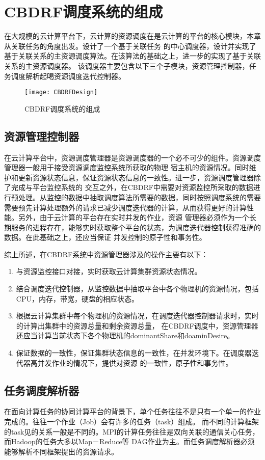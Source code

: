 \section{CBDRF调度系统的组成}
在大规模的云计算平台下，云计算的资源调度在是云计算的平台的核心模块，本章从关联任务的角度出发。设计了一个基于关联任务
的中心调度器，设计并实现了基于关联关系的主资源调度算法。在该算法的基础之上，进一步的实现了基于关联关系的主资源调度器。
该调度器主要包含以下三个子模块，资源管理控制器，任务调度解析起喝资源调度迭代控制器。
\begin{figure}[htbp]
\centering\texttt{[image: CBDRFDesign]}
\caption{CBDRF调度系统的组成}\label{fig:CBDRFDesign}
\end{figure}
\subsection{资源管理控制器}
在云计算平台中，资源调度管理器是资源调度器的一个必不可少的组件。资源调度管理器一般用于接受资源调度监控系统所获取的物理
宿主机的资源情况。同时维护和更新资源状态信息，保证资源状态信息的一致性。进一步，资源调度管理器除了完成与平台监控系统的
交互之外，在CBDRF中需要对资源监控所采取的数据进行预处理。从监控的数据中抽取调度算法所需要的数据，同时按照调度系统的需要
需要预先计算处理额外的请求已减少调度迭代器的计算，从而获得更好的计算性能。另外，由于云计算的平台存在实时并发的作业，资源
管理器必须作为一个长期服务的进程存在，能够实时获取整个平台的状态，为调度迭代器控制获得准确的数据。在此基础之上，还应当保证
并发控制的原子性和事务性。

综上所述，在CBDRF系统中资源管理器涉及的操作主要有以下：
\begin{enumerate}
\item 与资源监控接口对接，实时获取云计算集群资源状态情况。
\item 结合调度迭代控制器，从监控数据中抽取平台中各个物理机的资源情况，包括CPU，内存，带宽，硬盘的相应状态。
\item 根据云计算集群中每个物理机的资源情况，在调度迭代器控制器请求时，实时的计算出集群中的资源总量和剩余资源总量，
在CBDRF调度中，资源管理器还应当计算当前状态下各个物理机的dominantShare和doaminDesire。
\item 保证数据的一致性，保证集群状态信息的一致性，在并发环境下。在调度器迭代器高并发作业的情况下，提供对资源
的一致性，原子性和事务性。
\end{enumerate}

\subsection{任务调度解析器}
在面向计算任务的协同计算平台的背景下，单个任务往往不是只有一个单一的作业完成的。往往一个作业（Job）会有许多的任务（task）组成。
而不同的计算框架的task见的关系一般是不同的。MPI的计算任务往往是双向关联的通信关心任务，而Hadoop的任务大多以Map－Reduce等
DAG作业为主。而任务调度解析器必须能够解析不同框架提出的资源请求。


